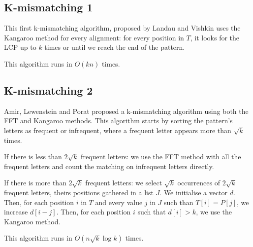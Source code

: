 \documentclass[preprint,12pt]{elsarticle}
\begin{document}
\subsection{K-mismatching 1}

This first k-mismatching algorithm, proposed by Landau and Vishkin\cite{Kangaroo}
uses the Kangaroo method for every alignment:
for every position in $T$, it looks for the LCP up to $k$ times or until we reach the end of the pattern.

This algorithm runs in $O(kn)$ times.







\subsection{K-mismatching 2}
Amir, Lewenstein and Porat\cite{Kmism2} proposed a k-mismatching algorithm
using both the FFT and Kangaroo methods.
This algorithm starts by sorting the pattern's letters as frequent or infrequent,
where a frequent letter appears more than $\sqrt{k}$ times.

If there is less than $2\sqrt{k}$ frequent letters: 
we use the FFT method with all the frequent letters and count the matching on infrequent letters directly.

If there is more than $2\sqrt{k}$ frequent letters:
we select $\sqrt{k}$ occurrences of $2\sqrt{k}$ frequent letters,
theirs positions gathered in a list $J$.
We initialise a vector $d$.
Then, for each position $i$ in $T$ and every value $j$ in $J$ such than $T[i] = P[j]$,
we increase $d[i-j]$.
Then, for each position $i$ such that $d[i]>k$, we use the Kangaroo method.

This algorithm runs in $O(n\sqrt{k} \log k)$ times.
\end{document}
